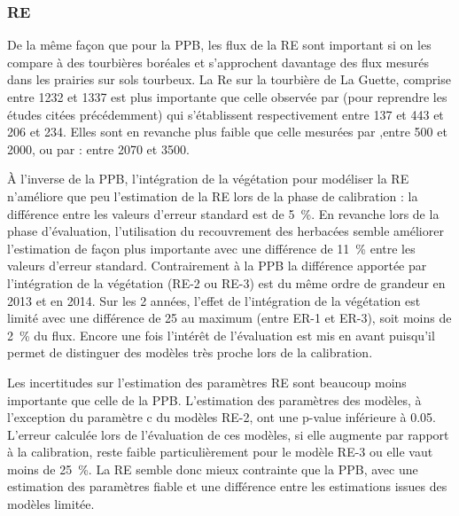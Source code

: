 \subsubsection{RE}

De la même façon que pour la PPB, les flux de la RE sont important si on les compare à des tourbières boréales et s'approchent davantage des flux mesurés dans les prairies sur sols tourbeux.
La Re sur la tourbière de La Guette, comprise entre 1232 et \SI{1337}{\gcma} est plus importante que celle observée par \citep{peichl2014,trudeau2014} (pour reprendre les études citées précédemment) qui s'établissent respectivement entre 137 et \SI{443}{\gcma} et 206 et \SI{234}{\gcma}.
Elles sont en revanche plus faible que celle mesurées par \citep{jacobs2007},entre 500 et \SI{2000}{\gcma}, ou par \citep{gorres2014} : entre 2070 et \SI{3500}{\gcma}. 

%
%
%
%

À l'inverse de la PPB, l'intégration de la végétation pour modéliser la RE n'améliore que peu l'estimation de la RE lors de la phase de calibration : la différence entre les valeurs d'erreur standard est de \SI{5}{\percent}.
En revanche lors de la phase d'évaluation, l'utilisation du recouvrement des herbacées semble améliorer l'estimation de façon plus importante avec une différence de \SI{11}{\percent} entre les valeurs d'erreur standard.
Contrairement à la PPB la différence apportée par l'intégration de la végétation (RE-2 ou RE-3) est du même ordre de grandeur en 2013 et en 2014.
Sur les 2 années, l'effet de l'intégration de la végétation est limité avec une différence de \SI{25}{\gcma} au maximum (entre ER-1 et ER-3), soit moins de \SI{2}{\percent} du flux.
Encore une fois l'intérêt de l'évaluation est mis en avant puisqu'il permet de distinguer des modèles très proche lors de la calibration.


Les incertitudes sur l'estimation des paramètres RE sont beaucoup moins importante que celle de la PPB.
L'estimation des paramètres des modèles, à l'exception du paramètre c du modèles RE-2, ont une p-value inférieure à 0.05.
L'erreur calculée lors de l'évaluation de ces modèles, si elle augmente par rapport à la calibration, reste faible particulièrement pour le modèle RE-3 ou elle vaut moins de \SI{25}{\percent}.
La RE semble donc mieux contrainte que la PPB, avec une estimation des paramètres fiable et une différence entre les estimations issues des modèles limitée.

